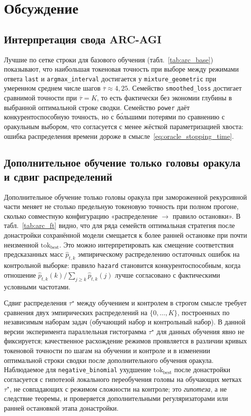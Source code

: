 \section{Обсуждение}\label{sec:discussion}

\subsection{Интерпретация свода ARC-AGI}

Лучшие по сетке строки для базового обучения (табл.~\ref{tab:arc_base}) показывают, что наибольшая
токеновая точность при выборе между режимами ответа \texttt{last} и \texttt{argmax\_interval}
достигается у \texttt{mixture\_geometric} при умеренном среднем числе шагов
\(\overline{\tau}\approx 4{,}25\). Семейство \texttt{smoothed\_loss} достигает сравнимой точности
при \(\overline{\tau}=K\), то есть фактически без экономии глубины в выбранной оптимальной строке
сводки. Семейство \texttt{power} даёт конкурентоспособную точность, но с б\'{о}льшими потерями по
сравнению с оракульным выбором, что согласуется с менее жёсткой параметризацией хвоста: ошибка
распределения времени дороже в смысле~\eqref{eq:oracle_stopping_time}.

\subsection{Дополнительное обучение только головы оракула и сдвиг распределений}

Дополнительное обучение только головы оракула при замороженной рекурсивной части меняет не столько
предельную токеновую точность при полном прогоне, сколько совместную конфигурацию «распределение
\(\rightarrow\) правило остановки». В табл.~\ref{tab:arc_ft} видно, что для ряда семейств
оптимальная стратегия после донастройки сохранённой модели смещается к более ранней остановке при
почти неизменной \(\mathrm{tok}_{\mathrm{best}}\). Это можно интерпретировать как смещение
соответствия предсказанных масс \(\widehat p_{t,k}\) эмпирическому распределению остаточных ошибок
на контрольной выборке: правило \texttt{hazard} становится конкурентоспособным, когда отношение
\(\widehat p_{t,k}(k)/\sum_{j\ge k}\widehat p_{t,k}(j)\) лучше согласовано с фактическими
условными частотами.

Сдвиг распределения \(\tau^\star\) между обучением и контролем в строгом смысле требует сравнения
двух эмпирических распределений на \(\{0,\ldots,K\}\), построенных по независимым наборам задач
(обучающий набор и контрольный набор). В данной версии эксперимента параллельная гистограмма
\(\tau^\star\) для данных обучения явно не фиксируется; качественное расхождение режимов
проявляется в различии кривых токеновой точности по шагам на обучении и контроле и в изменении
оптимальной строки сводки после дополнительного обучения оракула. Наблюдаемое для
\texttt{negative\_binomial} ухудшение \(\mathrm{tok}_{\mathrm{best}}\) после донастройки
согласуется с гипотезой локального переобучения головы на обучающих метках \(\tau^\star\), не
совпадающих с режимом сложности на контроле; это \emph{гипотеза}, а не следствие теоремы, и
проверяется дополнительными регуляризаторами или ранней остановкой этапа донастройки.

